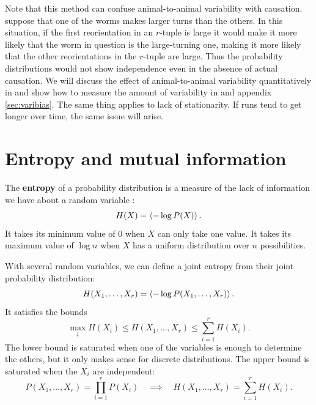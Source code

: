 \documentclass[12pt]{article}
\begin{document}
Note that this method can confuse animal-to-animal variability with causation. \Eg suppose that one of the worms makes larger turns than the others. In this situation, if the first reorientation in an $r$-tuple is large it would make it more likely that the worm in question is the large-turning one, making it more likely that the other reorientations in the $r$-tuple are large. Thus the probability distributions would not show independence even in the absence of actual causation. We will discuss the effect of animal-to-animal variability quantitatively in  and show how to measure the amount of variability in  and appendix \ref{sec:varibias}. The same thing applies to lack of stationarity. If runs tend to get longer over time, the same issue will arise.


\section{Entropy and mutual information}\label{sec:entropy}

The \textbf{entropy} of a probability distribution is a measure of the lack of information we have about a random variable \cite{Cover:2006}:
%
\begin{equation}\label{eq:ent}
  H(X) = \left\langle -\log P(X) \right\rangle.
\end{equation}
%
It takes its minimum value of $0$ when $X$ can only take one value. It takes its maximum value of $\log n$ when $X$ has a uniform distribution over $n$ possibilities.

With several random variables, we can define a joint entropy from their joint probability distribution:
%
\begin{equation}\label{eq:jointent}
  H(X_1,\ldots,X_r) = \left\langle -\log P(X_1,\ldots,X_r) \right\rangle.
\end{equation}
%
It satisfies the bounds
%
\begin{equation}\label{eq:entbounds}
  \max_i H(X_i) \leq H(X_1,\ldots,X_r) \leq \sum_{i=1}^r H(X_i).
\end{equation}
%
The lower bound is saturated when one of the variables is enough to determine the others, but it only makes sense for discrete distributions. The upper bound is saturated when the $X_i$ are independent:
%
\begin{equation}\label{eq:indent}
  P(X_1,\ldots,X_r) = \prod_{i=1}^r P(X_i)
  \quad \implies \quad
  H(X_1,\ldots,X_r) = \sum_{i=1}^r H(X_i).
\end{equation}
%
\end{document}
